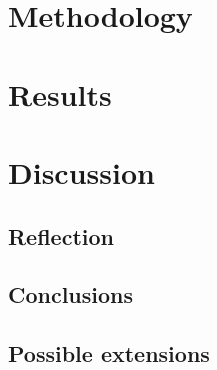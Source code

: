 \documentclass{article}
\begin{document}
\section{Methodology}

\section{Results}

\section{Discussion}

\subsection{Reflection}

\subsection{Conclusions}

\subsection{Possible extensions}

 

\end{document}
